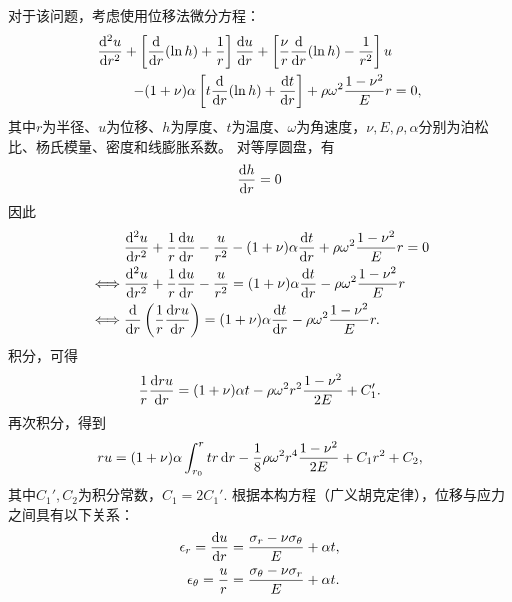 对于该问题，考虑使用位移法微分方程：
\begin{equation}
    \begin{aligned}
        \frac{\dif^2 u}{\dif r^2} + \left[ \frac{\dif}{\dif r} (\ln h )+ \frac{1}{r} \right] \frac{\dif u}{\dif r} + 
        \left[\frac{\nu}{r}\frac{\dif}{\dif r} (\ln h) - \frac{1}{r^2}\right] u & \\ 
        - (1 + \nu) \alpha \left[ t \frac{\dif}{\dif r} (\ln h) + \frac{\dif t}{\dif r}\right] +
        \rho \omega^2 \frac{1 - \nu^2}{E} r &= 0,
    \end{aligned}
\end{equation}
其中$r$为半径、$u$为位移、$h$为厚度、$t$为温度、$\omega$为角速度，$\nu, E, \rho, \alpha$分别为泊松比、杨氏模量、密度和线膨胀系数。
对等厚圆盘，有
\begin{equation}
    \frac{\mathop{} \! \mathrm{d} h}{\mathop{} \! \mathrm{d} r} = 0
\end{equation}
因此
\begin{equation}
    \begin{aligned}
        & \frac{\dif^2 u}{\dif r^2} + \frac{1}{r} \frac{\dif u}{\dif r} - \frac{u}{r^2} - (1 + \nu) \alpha \frac{\dif t}{\dif r} + \rho \omega^2 \frac{1 - \nu^2}{E} r = 0 \\
        \iff & \frac{\dif^2 u}{\dif r^2} + \frac{1}{r} \frac{\dif u}{\dif r} - \frac{u}{r^2} = (1 + \nu) \alpha \frac{\dif t}{\dif r} - \rho \omega^2 \frac{1 - \nu^2}{E} r \\
        \iff & \frac{\dif}{\dif r}\left( \frac{1}{r} \frac{\dif ru}{\dif r} \right) = (1 + \nu) \alpha \frac{\dif t}{\dif r} - \rho \omega^2 \frac{1 - \nu^2}{E} r.
    \end{aligned}
\end{equation}
积分，可得
\begin{equation}
    \frac{1}{r} \frac{\mathop{} \! \mathrm{d} ru}{\mathop{} \! \mathrm{d} r} = (1 + \nu) \alpha t- \rho \omega^2 r^2 \frac{1 - \nu^2}{2E} + C_1'.
\end{equation}
再次积分，得到
\begin{equation}
    ru = (1 + \nu) \alpha \int_{r_0}^r tr \mathop{} \! \mathrm{d} r - \frac{1}{8} \rho \omega^2 r^4 \frac{1 - \nu^2}{2E} + C_1 r^2 + C_2,
\end{equation}
其中$C_1', C_2$为积分常数，$C_1 = 2C_1'$.
根据本构方程（广义胡克定律），位移与应力之间具有以下关系：
\begin{equation}
    \begin{aligned}
        \epsilon_r = \frac{\mathop{} \! \mathrm{d} u}{\mathop{} \! \mathrm{d} r} &= \frac{\sigma_r - \nu \sigma_\theta}{E} + \alpha t, \\
        \epsilon_\theta = \frac{u}{r} &= \frac{\sigma_\theta - \nu \sigma_r}{E} + \alpha t.
    \end{aligned}
\end{equation}
